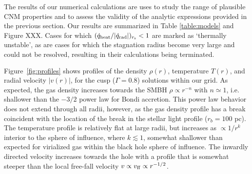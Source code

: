 \documentclass[usenatbib,fleqn]{mn2e}
\newcommand{\rb}{r_b}
\newcommand{\Mbh}[1][]{M_{\bullet#1}}
\begin{document}

The results of our numerical calculations are uses to study the range of plausible CNM properties and to assess the validity of the analytic expressions provided in the previous section.  Our results are summarized in Table \ref{table:models} and Figure XXX.  Cases for which $(\dot{q}_{\rm heat}/|\dot{q}_{\rm rad}|)_{r_{\rm s}} < 1$ are marked as `thermally unstable', as are cases for which the stagnation radius become very large and could not be resolved, resulting in their calculations being terminated.  

Figure~\ref{fig:profiles} shows profiles of the density $\rho(r)$,
temperature $T(r)$, and radial velocity $|v(r)|$, for the cusp
($\Gamma=0.8$) solutions within our grid.  As expected, the gas
density increases towards the SMBH $\rho\propto r^{-n}$ with
$n\simeq1$, i.e. shallower than the $-3/2$ power law for
Bondi accretion. This power law behavior does not extend
through all radii, however, as the gas density profile has a break coincident
with the location of the break in the stellar light profile ($\rb=100$
pc). The temperature profile is relatively flat at large radii, but
increases as $\propto 1/r^{k}$ interior to the sphere of influence,
where $k\lesssim 1$, somewhat shallower than expected for virialized gas within the black hole sphere of influence.
The inwardly directed velocity increases towards the hole with a profile that is somewhat steeper than the local free-fall velocity $v \propto v_{\rm ff}\propto r^{-1/2}$.
\end{document}
